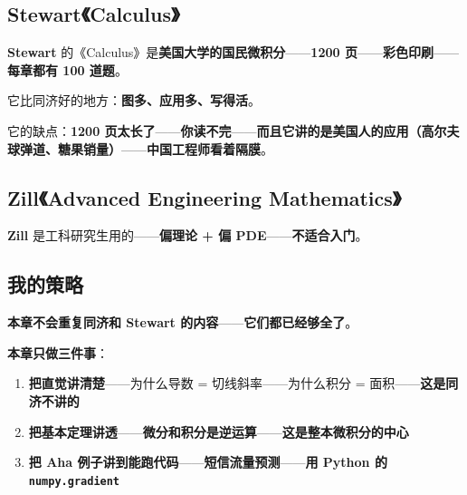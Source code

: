 \subsection{Stewart《Calculus》}

\textbf{Stewart} 的《Calculus》是\textbf{美国大学的国民微积分}——\textbf{1200 页}——\textbf{彩色印刷}——\textbf{每章都有 100 道题}。

它比同济好的地方：\textbf{图多、应用多、写得活}。

它的缺点：\textbf{1200 页太长了}——\textbf{你读不完}——\textbf{而且它讲的是美国人的应用（高尔夫球弹道、糖果销量）}——\textbf{中国工程师看着隔膜}。

\subsection{Zill《Advanced Engineering Mathematics》}

\textbf{Zill} 是工科研究生用的——\textbf{偏理论 + 偏 PDE}——\textbf{不适合入门}。

\subsection{我的策略}

\textbf{本章不会重复同济和 Stewart 的内容}——\textbf{它们都已经够全了}。

\textbf{本章只做三件事}：

\begin{enumerate}
\item \textbf{把直觉讲清楚}——为什么导数 = 切线斜率——为什么积分 = 面积——\textbf{这是同济不讲的}
\item \textbf{把基本定理讲透}——\textbf{微分和积分是逆运算}——\textbf{这是整本微积分的中心}
\item \textbf{把 Aha 例子讲到能跑代码}——\textbf{短信流量预测}——\textbf{用 Python 的 \texttt{numpy.gradient}}
\end{enumerate}

